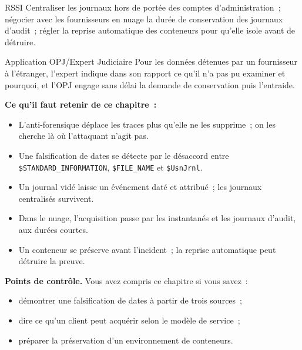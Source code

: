 \begin{boxmetier}{RSSI}
Centraliser les journaux hors de portée des comptes d'administration~;
négocier avec les fournisseurs en nuage la durée de conservation des
journaux d'audit~; régler la reprise automatique des conteneurs pour
qu'elle isole avant de détruire.
\end{boxmetier}

\begin{boxmetier}{Application OPJ/Expert Judiciaire}
Pour les données détenues par un fournisseur à l'étranger, l'expert indique
dans son rapport ce qu'il n'a pas pu examiner et pourquoi, et l'OPJ engage
sans délai la demande de conservation puis l'entraide.
\end{boxmetier}

\separateur

\begin{boxresume}
\textbf{Ce qu'il faut retenir de ce chapitre~:}
\begin{itemize}
    \item L'anti-forensique déplace les traces plus qu'elle ne les
          supprime~; on les cherche là où l'attaquant n'agit pas.
    \item Une falsification de dates se détecte par le désaccord entre
          \texttt{\$STANDARD\_INFORMATION}, \texttt{\$FILE\_NAME} et
          \texttt{\$UsnJrnl}.
    \item Un journal vidé laisse un événement daté et attribué~; les
          journaux centralisés survivent.
    \item Dans le nuage, l'acquisition passe par les instantanés et les
          journaux d'audit, aux durées courtes.
    \item Un conteneur se préserve avant l'incident~; la reprise automatique
          peut détruire la preuve.
\end{itemize}
\end{boxresume}

\begin{boxinfo}
\textbf{Points de contrôle.} Vous avez compris ce chapitre si vous savez~:
\begin{itemize}
    \item démontrer une falsification de dates à partir de trois sources~;
    \item dire ce qu'un client peut acquérir selon le modèle de service~;
    \item préparer la préservation d'un environnement de conteneurs.
\end{itemize}
\end{boxinfo}

